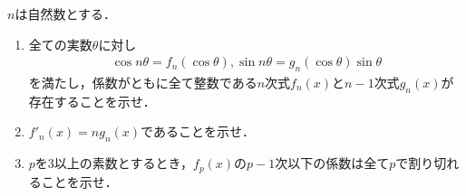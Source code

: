 \documentclass[../../main.tex]{subfiles}
\begin{document}
$n$は自然数とする．
\begin{enumerate}
  \item 全ての実数$\theta$に対し
    \begin{align*}
      \cos n\theta=f_n(\cos\theta), \sin n\theta=g_n(\cos\theta)\sin\theta
    \end{align*}
    を満たし，係数がともに全て整数である$n$次式$f_n(x)$と$n-1$次式$g_n(x)$が存在することを示せ．
  \item $f'_n(x)=ng_n(x)$であることを示せ．
  \item $p$を$3$以上の素数とするとき，$f_p(x)$の$p-1$次以下の係数は全て$p$で割り切れることを示せ．
\end{enumerate}
\end{document}
